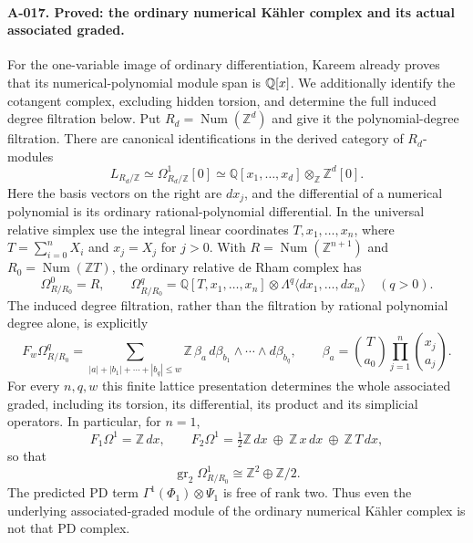 \paragraph{A-017. Proved: the ordinary numerical K\"ahler complex and its actual associated graded.}
For the one-variable image of ordinary differentiation, Kareem
\cite[Theorem~6.3.10 and Corollary~6.3.12, pp.~135--136]{A_Kareem2018}
already proves that its numerical-polynomial module span is $\mathbb Q[x]$.
We additionally identify the cotangent complex, excluding hidden
torsion, and determine the full induced degree filtration below.
Put $R_d=\operatorname{Num}(\mathbb Z^d)$ and give it the
polynomial-degree filtration. There are canonical identifications
in the derived category of $R_d$-modules
\[
 L_{R_d/\mathbb Z}\simeq
 \Omega^1_{R_d/\mathbb Z}[0]
 \simeq \mathbb Q[x_1,\ldots,x_d]\otimes_{\mathbb Z}\mathbb Z^d[0].
 \tag{A-14}
\]
Here the basis vectors on the right are $dx_j$, and the differential
of a numerical polynomial is its ordinary rational-polynomial
differential. In the universal relative simplex use the integral
linear coordinates $T,x_1,\ldots,x_n$, where
$T=\sum_{i=0}^nX_i$ and $x_j=X_j$ for $j>0$. With
$R=\operatorname{Num}(\mathbb Z^{n+1})$ and
$R_0=\operatorname{Num}(\mathbb Z T)$, the ordinary relative de Rham
complex has
\[
 \Omega^0_{R/R_0}=R,\qquad
 \Omega^q_{R/R_0}=
 \mathbb Q[T,x_1,\ldots,x_n]\otimes
 \Lambda^q\langle dx_1,\ldots,dx_n\rangle\quad(q>0).
 \tag{A-15}
\]
The induced degree filtration, rather than the filtration by rational
polynomial degree alone, is explicitly
\[
 F_w\Omega^q_{R/R_0}
 =\sum_{|a|+|b_1|+\cdots+|b_q|\leq w}
 \mathbb Z\,
 \beta_a\,d\beta_{b_1}\wedge\cdots\wedge d\beta_{b_q},
 \qquad
 \beta_a=\binom{T}{a_0}\prod_{j=1}^n\binom{x_j}{a_j}.
 \tag{A-16}
\]
For every $n,q,w$ this finite lattice presentation determines the
whole associated graded, including its torsion, its differential,
its product and its simplicial operators. In particular, for $n=1$,
\[
 F_1\Omega^1=\mathbb Z\,dx,
 \qquad
 F_2\Omega^1=
 \tfrac12\mathbb Z\,dx\ \oplus\ \mathbb Z\,x\,dx
 \ \oplus\ \mathbb Z\,T\,dx,
\]
so that
\[
 \operatorname{gr}_2\Omega^1_{R/R_0}
 \cong\mathbb Z^2\oplus\mathbb Z/2.
 \tag{A-17}
\]
The predicted PD term $\Gamma^1(\Phi_1)\otimes\Psi_1$ is free of
rank two. Thus even the underlying associated-graded module of the
ordinary numerical K\"ahler complex is not that PD complex.

